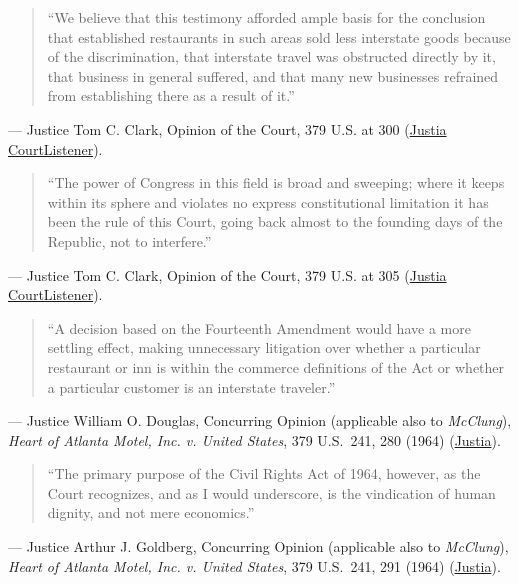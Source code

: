 \documentclass[12pt]{article}
\begin{document}
\begin{quote}
``We believe that this testimony afforded ample basis for the conclusion that established restaurants in such areas sold less interstate goods because of the discrimination, that interstate travel was obstructed directly by it, that business in general suffered, and that many new businesses refrained from establishing there as a result of it.''
\end{quote}
\noindent --- Justice Tom C. Clark, Opinion of the Court, 379 U.S. at 300 (\href{https://supreme.justia.com/cases/federal/us/379/294/}{Justia} \textbar{} \href{https://www.courtlistener.com/opinion/106951/katzenbach-v-mcclung/}{CourtListener}).

\begin{quote}
``The power of Congress in this field is broad and sweeping; where it keeps within its sphere and violates no express constitutional limitation it has been the rule of this Court, going back almost to the founding days of the Republic, not to interfere.''
\end{quote}
\noindent --- Justice Tom C. Clark, Opinion of the Court, 379 U.S. at 305 (\href{https://supreme.justia.com/cases/federal/us/379/294/}{Justia} \textbar{} \href{https://www.courtlistener.com/opinion/106951/katzenbach-v-mcclung/}{CourtListener}).

\begin{quote}
``A decision based on the Fourteenth Amendment would have a more settling effect, making unnecessary litigation over whether a particular restaurant or inn is within the commerce definitions of the Act or whether a particular customer is an interstate traveler.''
\end{quote}
\noindent --- Justice William O. Douglas, Concurring Opinion (applicable also to \textit{McClung}), \textit{Heart of Atlanta Motel, Inc. v. United States}, 379 U.S.\ 241, 280 (1964) (\href{https://supreme.justia.com/cases/federal/us/379/241/}{Justia}).

\begin{quote}
``The primary purpose of the Civil Rights Act of 1964, however, as the Court recognizes, and as I would underscore, is the vindication of human dignity, and not mere economics.''
\end{quote}
\noindent --- Justice Arthur J. Goldberg, Concurring Opinion (applicable also to \textit{McClung}), \textit{Heart of Atlanta Motel, Inc. v. United States}, 379 U.S.\ 241, 291 (1964) (\href{https://supreme.justia.com/cases/federal/us/379/241/}{Justia}).
\end{document}
